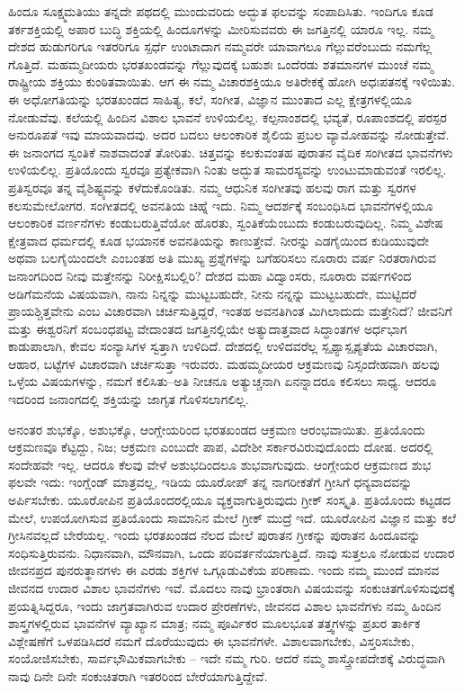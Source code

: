 ಹಿಂದೂ ಸೂಕ್ಷ್ಮಮತಿಯು ತನ್ನದೇ ಪಥದಲ್ಲಿ ಮುಂದುವರಿದು ಅದ್ಭುತ ಫಲವನ್ನು ಸಂಪಾದಿಸಿತು. ಇಂದಿಗೂ ಕೂಡ ತರ್ಕಶಕ್ತಿಯಲ್ಲಿ ಅಪಾರ ಬುದ್ಧಿ ಶಕ್ತಿಯಲ್ಲಿ ಹಿಂದೂಗಳನ್ನು ಮೀರಿಸುವವರು ಈ ಜಗತ್ತಿನಲ್ಲಿ ಯಾರೂ ಇಲ್ಲ. ನಮ್ಮ ದೇಶದ ಹುಡುಗರಿಗೂ ಇತರರಿಗೂ ಸ್ಪರ್ಧೆ ಉಂಟಾದಾಗ ನಮ್ಮವರೇ ಯಾವಾಗಲೂ ಗೆಲ್ಲುವರೆಂಬುದು ನಮಗೆಲ್ಲ ಗೊತ್ತಿದೆ. ಮಹಮ್ಮದೀಯರು ಭರತಖಂಡವನ್ನು ಗೆಲ್ಲುವುದಕ್ಕೆ ಬಹುಶಃ ಒಂದೆರಡು ಶತಮಾನಗಳ ಮುಂಚೆ ನಮ್ಮ ರಾಷ್ಟ್ರೀಯ ಶಕ್ತಿಯು ಕುಂಠಿತವಾಯಿತು. ಆಗ ಈ ನಮ್ಮ ವಿಚಾರಶಕ್ತಿಯೂ ಅತಿರೇಕಕ್ಕೆ ಹೋಗಿ ಅಧಃಪತನಕ್ಕೆ ಇಳಿಯಿತು. ಈ ಅಧೋಗತಿಯನ್ನು ಭರತಖಂಡದ ಸಾಹಿತ್ಯ, ಕಲೆ, ಸಂಗೀತ, ವಿಜ್ಞಾನ ಮುಂತಾದ ಎಲ್ಲ ಕ್ಷೇತ್ರಗಳಲ್ಲಿಯೂ ನೋಡುವೆವು. ಕಲೆಯಲ್ಲಿ ಹಿಂದಿನ ವಿಶಾಲ ಭಾವನೆ ಉಳಿಯಲಿಲ್ಲ. ಕಲ್ಪನಾಂಶದಲ್ಲಿ ಭವ್ಯತೆ, ರೂಪಾಂಶದಲ್ಲಿ ಪರಸ್ಪರ ಅನುರೂಪತೆ ಇವು ಮಾಯವಾದವು. ಅದರ ಬದಲು ಆಲಂಕಾರಿಕ ಶೈಲಿಯ ಪ್ರಬಲ ವ್ಯಾಮೋಹವನ್ನು ನೋಡುತ್ತೇವೆ. ಈ ಜನಾಂಗದ ಸ್ವಂತಿಕೆ ನಾಶವಾದಂತೆ ತೋರಿತು. ಚಿತ್ತವನ್ನು ಕಲಕುವಂತಹ ಪುರಾತನ ವೈದಿಕ ಸಂಗೀತದ ಭಾವನೆಗಳು ಉಳಿಯಲಿಲ್ಲ. ಪ್ರತಿಯೊಂದು ಸ್ವರವೂ ಪ್ರತ್ಯೇಕವಾಗಿ ನಿಂತು ಅದ್ಭುತ ಸಾಮರಸ್ಯವನ್ನು ಉಂಟುಮಾಡುವಂತೆ ಇರಲಿಲ್ಲ. ಪ್ರತಿಸ್ವರವೂ ತನ್ನ ವೈಶಿಷ್ಟ್ಯವನ್ನು ಕಳೆದುಕೊಂಡಿತು. ನಮ್ಮ ಆಧುನಿಕ ಸಂಗೀತವು ಹಲವು ರಾಗ ಮತ್ತು ಸ್ವರಗಳ ಕಲಸುಮೇಲೋಗರ. ಸಂಗೀತದಲ್ಲಿ ಅವನತಿಯ ಚಿಹ್ನೆ ಇದು. ನಿಮ್ಮ ಆದರ್ಶಕ್ಕೆ ಸಂಬಂಧಿಸಿದ ಭಾವನೆಗಳಲ್ಲಿಯೂ ಆಲಂಕಾರಿಕ ವರ್ಣನೆಗಳು ಕಂಡುಬರುತ್ತಿವೆಯೋ ಹೊರತು, ಸ್ವಂತಿಕೆಯೆಂಬುದು ಕಂಡುಬರುವುದಿಲ್ಲ. ನಿಮ್ಮ ವಿಶೇಷ ಕ್ಷೇತ್ರವಾದ ಧರ್ಮದಲ್ಲಿ ಕೂಡ ಭಯಾನಕ ಅವನತಿಯನ್ನು ಕಾಣುತ್ತೇವೆ. ನೀರನ್ನು ಎಡಗೈಯಿಂದ ಕುಡಿಯುವುದೇ ಅಥವಾ ಬಲಗೈಯಿಂದಲೇ ಎಂಬಂತಹ ಅತಿ ಮುಖ್ಯ ಪ್ರಶ್ನೆಗಳನ್ನು ಬಗೆಹರಿಸಲು ನೂರಾರು ವರ್ಷ ನಿರತರಾಗಿರುವ ಜನಾಂಗದಿಂದ ನೀವು ಮತ್ತೇನನ್ನು ನಿರೀಕ್ಷಿಸಬಲ್ಲಿರಿ? ದೇಶದ ಮಹಾ ವಿದ್ವಾಂಸರು, ನೂರಾರು ವರ್ಷಗಳಿಂದ ಅಡಿಗೆಮನೆಯ ವಿಷಯವಾಗಿ, ನಾನು ನಿನ್ನನ್ನು ಮುಟ್ಟಬಹುದೇ, ನೀನು ನನ್ನನ್ನು ಮುಟ್ಟಬಹುದೇ, ಮುಟ್ಟಿದರೆ ಪ್ರಾಯಶ್ಚಿತ್ತವೇನು ಎಂಬ ವಿಚಾರವಾಗಿ ಚರ್ಚಿಸುತ್ತಿದ್ದರೆ, ಇಂತಹ ಅವನತಿಗಿಂತ ಮಿಗಿಲಾದುದು ಮತ್ತೇನಿದೆ? ಜೀವನಿಗೆ ಮತ್ತು ಈಶ್ವರನಿಗೆ ಸಂಬಂಧಪಟ್ಟ ವೇದಾಂತದ ಜಗತ್ತಿನಲ್ಲಿಯೇ ಅತ್ಯುದಾತ್ತವಾದ ಸಿದ್ಧಾಂತಗಳ ಅರ್ಧಭಾಗ ಕಾಡುಪಾಲಾಗಿ, ಕೇವಲ ಸಂನ್ಯಾಸಿಗಳ ಸ್ವತ್ತಾಗಿ ಉಳಿದಿದೆ. ದೇಶದಲ್ಲಿ ಉಳಿದವರೆಲ್ಲ ಸ್ಪೃಶ್ಯಾಸ್ಪೃಶ್ಯತೆಯ ವಿಚಾರವಾಗಿ, ಆಹಾರ, ಬಟ್ಟೆಗಳ ವಿಚಾರವಾಗಿ ಚರ್ಚಿಸುತ್ತಾ ಇರುವರು. ಮಹಮ್ಮದೀಯರ ಆಕ್ರಮಣವು ನಿಸ್ಸಂದೇಹವಾಗಿ ಹಲವು ಒಳ್ಳೆಯ ವಿಷಯಗಳನ್ನು, ನಮಗೆ ಕಲಿಸಿತು–ಅತಿ ನೀಚನೂ ಅತ್ಯುಚ್ಚನಾಗಿ ಏನನ್ನಾದರೂ ಕಲಿಸಲು ಸಾಧ್ಯ. ಆದರೂ ಇದರಿಂದ ಜನಾಂಗದಲ್ಲಿ ಶಕ್ತಿಯನ್ನು ಜಾಗೃತ ಗೊಳಿಸಲಾಗಲಿಲ್ಲ.

ಅನಂತರ ಶುಭಕ್ಕೊ, ಅಶುಭಕ್ಕೊ, ಆಂಗ್ಲೇಯರಿಂದ ಭರತಖಂಡದ ಆಕ್ರಮಣ ಆರಂಭವಾಯಿತು. ಪ್ರತಿಯೊಂದು ಆಕ್ರಮಣವೂ ಕೆಟ್ಟದ್ದು, ನಿಜ; ಆಕ್ರಮಣ ಎಂಬುದೇ ಪಾಪ, ವಿದೇಶೀ ಸರ್ಕಾರವಿರುವುದೊಂದು ದೋಷ. ಅದರಲ್ಲಿ ಸಂದೇಹವೇ ಇಲ್ಲ. ಆದರೂ ಕೆಲವು ವೇಳೆ ಅಶುಭದಿಂದಲೂ ಶುಭವಾಗುವುದು. ಆಂಗ್ಲೇಯರ ಆಕ್ರಮಣದ ಶುಭ ಫಲವೇ ಇದು: ಇಂಗ್ಲೆಂಡ್​ ಮಾತ್ರವಲ್ಲ, ಇಡಿಯ ಯೂರೋಪ್​ ತನ್ನ ನಾಗರೀಕತೆಗೆ ಗ್ರೀಸಿಗೆ ಧನ್ಯವಾದವನ್ನು ಅರ್ಪಿಸಬೇಕು. ಯೂರೋಪಿನ ಪ್ರತಿಯೊಂದರಲ್ಲಿಯೂ ವ್ಯಕ್ತವಾಗುತ್ತಿರುವುದು ಗ್ರೀಕ್​ ಸಂಸ್ಕೃತಿ. ಪ್ರತಿಯೊಂದು ಕಟ್ಟಡದ ಮೇಲೆ, ಉಪಯೋಗಿಸುವ ಪ್ರತಿಯೊಂದು ಸಾಮಾನಿನ ಮೇಲೆ ಗ್ರೀಕ್​ ಮುದ್ರೆ ಇದೆ. ಯೂರೋಪಿನ ವಿಜ್ಞಾನ ಮತ್ತು ಕಲೆ ಗ್ರೀಸಿನವಲ್ಲದೆ ಬೇರೆಯಲ್ಲ. ಇಂದು ಭರತಖಂಡದ ನೆಲದ ಮೇಲೆ ಪುರಾತನ ಗ್ರೀಕನ್ನು ಪುರಾತನ ಹಿಂದೂವನ್ನು ಸಂಧಿಸುತ್ತಿರುವನು. ನಿಧಾನವಾಗಿ, ಮೌನವಾಗಿ, ಒಂದು ಪರಿವರ್ತನೆಯಾಗುತ್ತಿದೆ. ನಾವು ಸುತ್ತಲೂ ನೋಡುವ ಉದಾರ ಜೀವನಪ್ರದ ಪುನರುತ್ಥಾನಗಳು ಈ ಎರಡು ಶಕ್ತಿಗಳ ಒಗ್ಗೂಡುವಿಕೆಯ ಪರಿಣಾಮ. ಇಂದು ನಮ್ಮ ಮುಂದೆ ಮಾನವ ಜೀವನದ ಉದಾರ ವಿಶಾಲ ಭಾವನೆಗಳು ಇವೆ. ಮೊದಲು ನಾವು ಭ್ರಾಂತರಾಗಿ ವಿಷಯವನ್ನು ಸಂಕುಚಿತಗೊಳಿಸುವುದಕ್ಕೆ ಪ್ರಯತ್ನಿಸಿದ್ದರೂ, ಇಂದು ಜಾಗ್ರತವಾಗಿರುವ ಉದಾರ ಪ್ರೇರಣೆಗಳು, ಜೀವನದ ವಿಶಾಲ ಭಾವನೆಗಳು ನಮ್ಮ ಹಿಂದಿನ ಶಾಸ್ತ್ರಗಳಲ್ಲಿರುವ ಭಾವನೆಗಳ ವ್ಯಾಖ್ಯಾನ ಮಾತ್ರ; ನಮ್ಮ ಪೂರ್ವಿಕರ ಮೂಲಭೂತ ತತ್ತ್ವಗಳನ್ನು ಪ್ರಖರ ತಾರ್ಕಿಕ ವಿಶ್ಲೇಷಣೆಗೆ ಒಳಪಡಿಸಿದರೆ ನಮಗೆ ದೊರೆಯುವುದು ಈ ಭಾವನೆಗಳೇ. ವಿಶಾಲವಾಗಬೇಕು, ವಿಸ್ತರಿಸಬೇಕು, ಸಂಯೋಜಿಸಬೇಕು, ಸಾರ್ವಭೌಮಿಕವಾಗಬೇಕು – ಇದೇ ನಮ್ಮ ಗುರಿ. ಆದರೆ ನಮ್ಮ ಶಾಸ್ತ್ರೋಪದೇಶಕ್ಕೆ ವಿರುದ್ಧವಾಗಿ ನಾವು ದಿನೇ ದಿನೇ ಸಂಕುಚಿತರಾಗಿ ಇತರರಿಂದ ಬೇರೆಯಾಗುತ್ತಿದ್ದೇವೆ.

